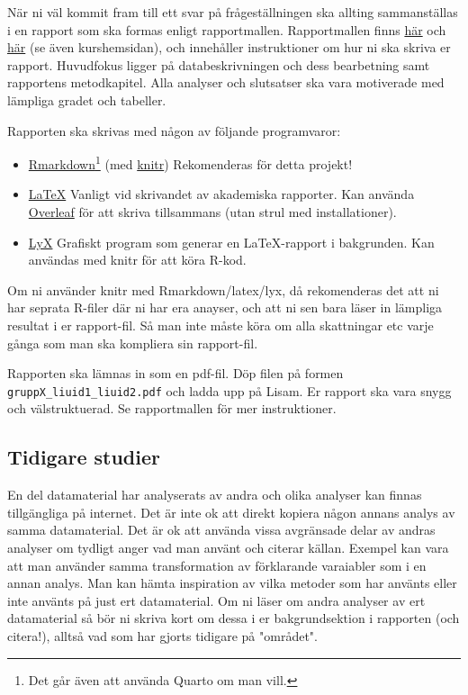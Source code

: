 \documentclass[a4paper]{article}
\begin{document}
När ni väl kommit fram till ett svar på frågeställningen ska allting sammanställas i en rapport som ska formas enligt rapportmallen. Rapportmallen finns \href{https://raw.githubusercontent.com/STIMALiU/732G12_DM/master/project/template/Rapportmall STIMA projekt.rmd}{här} och \href{https://raw.githubusercontent.com/STIMALiU/732G12_DM/master/project/template/Rapportmall-STIMA-projekt.pdf}{här} (se även kurshemsidan), och innehåller instruktioner om hur ni ska skriva er rapport. Huvudfokus ligger på databeskrivningen och dess bearbetning samt rapportens metodkapitel. Alla analyser och slutsatser ska vara motiverade med lämpliga gradet och tabeller.

Rapporten ska skrivas med någon av följande programvaror:
\begin{itemize}
    \item \href{https://rmarkdown.rstudio.com/}{Rmarkdown}\footnote{Det går även att använda Quarto om man vill.} (med \href{https://yihui.org/knitr/}{knitr}) Rekomenderas för detta projekt!
    \item \href{https://en.wikipedia.org/wiki/LaTeX}{LaTeX} Vanligt vid skrivandet av akademiska rapporter. Kan använda \href{https://www.overleaf.com}{Overleaf} för att skriva tillsammans (utan strul med installationer).
    \item \href{https://www.lyx.org/}{LyX} Grafiskt program som generar en LaTeX-rapport i bakgrunden. Kan användas med knitr för att köra R-kod.
\end{itemize}
Om ni använder knitr med Rmarkdown/latex/lyx, då rekomenderas det att ni har seprata R-filer där ni har era anayser, och att ni sen bara läser in lämpliga resultat i er rapport-fil. Så man inte måste köra om alla skattningar etc varje gånga som man ska kompliera sin rapport-fil. 

Rapporten ska lämnas in som en pdf-fil.  Döp filen på formen \texttt{gruppX\_liuid1\_liuid2.pdf} och ladda upp på Lisam. Er rapport ska vara snygg och välstruktuerad. Se rapportmallen för mer instruktioner.


\subsection*{Tidigare studier}
En del datamaterial har analyserats av andra och olika analyser kan finnas tillgängliga på internet. Det är inte ok att direkt kopiera någon annans analys av samma datamaterial. Det är ok att använda vissa avgränsade delar av andras analyser om tydligt anger vad man använt och citerar källan. Exempel kan vara att man använder samma transformation av förklarande varaiabler som i en annan analys. Man kan hämta inspiration av vilka metoder som har använts eller inte använts på just ert datamaterial. Om ni läser om andra analyser av ert datamaterial så bör ni skriva kort om dessa i er bakgrundsektion i rapporten (och citera!), alltså vad som har gjorts tidigare på "området". 
\end{document}
